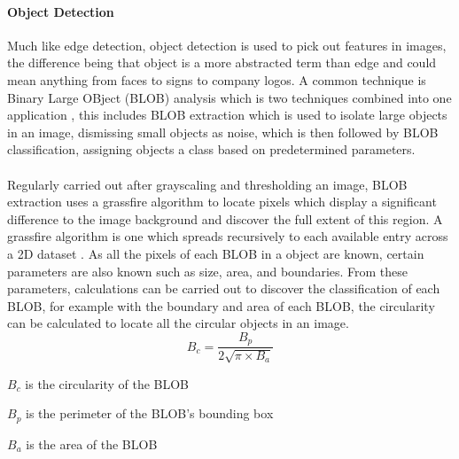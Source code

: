 	\paragraph{Object Detection}
	Much like edge detection, object detection is used to pick out features in images, the 
	difference being that object is a more abstracted term than edge and could mean anything from 
	faces to signs to company logos. A common technique is Binary Large OBject (BLOB) analysis 
	which is two techniques combined into one application \citep{introtoprocessing}, this includes 
	BLOB extraction which is used to isolate large objects in an image, dismissing small objects as 
	noise, which is then followed by BLOB classification, assigning objects a class based on 
	predetermined parameters.
	\\\\
	Regularly carried out after grayscaling and thresholding an image, BLOB extraction uses a grassfire algorithm to locate pixels which display a significant difference to the image background and discover the full extent of this region. A grassfire algorithm is one which spreads recursively to each available entry across a 2D dataset \citep{grassfire}. As all the pixels of each BLOB in a object are known, certain parameters are also known such as size, area, and boundaries. From these parameters, calculations can be carried out to discover the classification of each BLOB, for example with the boundary and area of each BLOB, the circularity can be calculated to locate all the circular objects in an image.
	\begin{equation}
		B_{c}=\frac{B_{p}}{2\sqrt{\pi \times B_{a}}}
	\end{equation}
	\begin{where}
		\item $B_{c}$ is the circularity of the BLOB
		\item $B_{p}$ is the perimeter of the BLOB's bounding box
		\item $B_{a}$ is the area of the BLOB
	\end{where}
